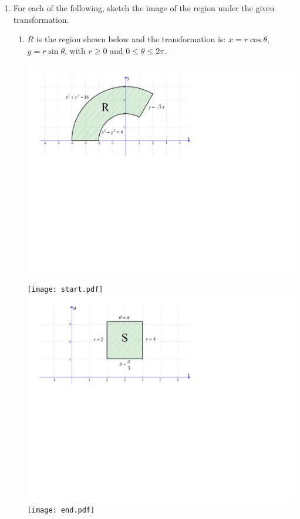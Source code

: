 \documentclass[12pt]{article}
\begin{document}
\begin{enumerate}

\item For each of the following, sketch the image of the region under the given transformation.

\begin{enumerate}

\item $R$ is the region shown below and the transformation is: $x=r\cos{\theta}$, $y=r\sin{\theta}$, with $r \geq 0$ and $0 \leq \theta \leq 2\pi$.

\begin{center}
\includegraphics[scale=0.6]{region1.pdf}
\end{center}

\texttt{[image: start.pdf]}
{{\includegraphics[scale=0.5]{region1a.pdf}}}
\texttt{[image: end.pdf]}



\end{enumerate}
\end{enumerate}
\end{document}
